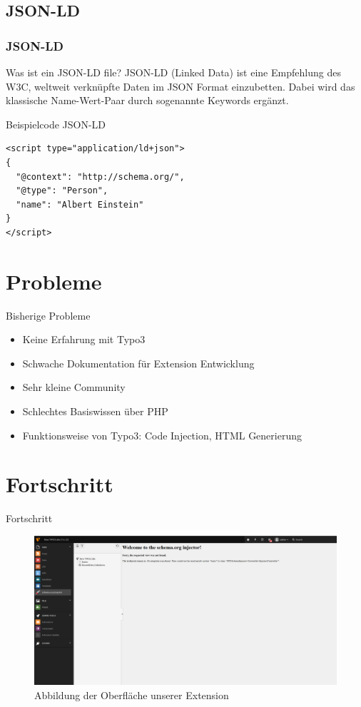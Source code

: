 \documentclass{beamer}
\begin{document}
\subsection{JSON-LD}

\begin{frame}[fragile]
\frametitle{JSON-LD}
\begin{block}{Was ist ein JSON-LD file?}
JSON-LD (Linked Data) ist eine Empfehlung des W3C, weltweit verknüpfte Daten im JSON Format einzubetten. Dabei wird das klassische Name-Wert-Paar durch sogenannte Keywords ergänzt.
\end{block}

\begin{block}{Beispielcode JSON-LD}
\begin{lstlisting}
<script type="application/ld+json">
{
  "@context": "http://schema.org/",
  "@type": "Person",
  "name": "Albert Einstein"
}
</script>
\end{lstlisting}
\end{block}
\end{frame}

\section{Probleme}

\begin{frame}{Bisherige Probleme}
\begin{itemize}
\item Keine Erfahrung mit Typo3
\item Schwache Dokumentation für Extension Entwicklung
\item Sehr kleine Community
\item Schlechtes Basiswissen über PHP
\item Funktionsweise von Typo3: Code Injection, HTML Generierung
\end{itemize}
\end{frame}


\section{Fortschritt}

\begin{frame}{Fortschritt}
\begin{figure}[ht]
\centering
\includegraphics[width=1.0\textwidth]{example_image.png}
\caption{Abbildung der Oberfläche unserer Extension}
\end{figure}
\end{frame}
\end{document}
